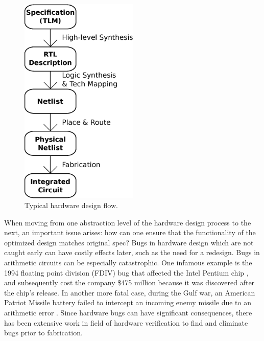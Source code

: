 {
\begin{figure}[h]
\centerline{
\includegraphics[width=0.5\textwidth]{./figures/designFlow}
}
\caption{Typical hardware design flow.}
\label{fig:cadflow}
\end{figure}
}

When moving from one abstraction level of the hardware design process to the 
next, an important issue arises: how can one ensure that the functionality of 
the optimized design matches original spec? 
Bugs in hardware design which are 
not caught early can have costly effects later, such as the need for a 
redesign. Bugs in arithmetic circuits can be especially catastrophic.
One infamous example is the 1994 floating point division (FDIV)
bug that affected the Intel Pentium chip \cite{nicely:FDIV}, 
and subsequently cost the company \$475 million because it was  
discovered after the chip's release. In another more fatal case, during the
Gulf war, an American Patriot Missile battery failed to intercept an incoming
enemy missile due to an arithmetic error \cite{arnold:patriot}.
Since hardware bugs can have significant consequences, 
there has been extensive work in field of hardware verification to find and
eliminate bugs prior to fabrication.

